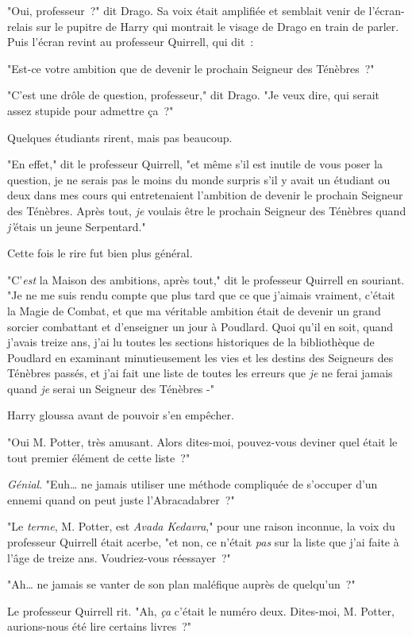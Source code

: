 "Oui, professeur~?" dit Drago. Sa voix était amplifiée et semblait venir de l'écran-relais sur le pupitre de Harry qui montrait le visage de Drago en train de parler. Puis l'écran revint au professeur Quirrell, qui dit~:

"Est-ce votre ambition que de devenir le prochain Seigneur des Ténèbres~?"

"C'est une drôle de question, professeur," dit Drago. "Je veux dire, qui serait assez stupide pour admettre ça~?"

Quelques étudiants rirent, mais pas beaucoup.

"En effet," dit le professeur Quirrell, "et même s'il est inutile de vous poser la question, je ne serais pas le moins du monde surpris s'il y avait un étudiant ou deux dans mes cours qui entretenaient l'ambition de devenir le prochain Seigneur des Ténèbres. Après tout, \emph{je} voulais être le prochain Seigneur des Ténèbres quand \emph{j'}étais un jeune Serpentard."

Cette fois le rire fut bien plus général.

"C'\emph{est} la Maison des ambitions, après tout," dit le professeur Quirrell en souriant. "Je ne me suis rendu compte que plus tard que ce que j'aimais vraiment, c'était la Magie de Combat, et que ma véritable ambition était de devenir un grand sorcier combattant et d'enseigner un jour à Poudlard. Quoi qu'il en soit, quand j'avais treize ans, j'ai lu toutes les sections historiques de la bibliothèque de Poudlard en examinant minutieusement les vies et les destins des Seigneurs des Ténèbres passés, et j'ai fait une liste de toutes les erreurs que \emph{je} ne ferai jamais quand \emph{je} serai un Seigneur des Ténèbres -"

Harry gloussa avant de pouvoir s'en empêcher.

"Oui M. Potter, très amusant. Alors dites-moi, pouvez-vous deviner quel était le tout premier élément de cette liste~?"

\emph{Génial}. "Euh… ne jamais utiliser une méthode compliquée de s'occuper d'un ennemi quand on peut juste l'Abracadabrer~?"

"Le \emph{terme}, M. Potter, est \emph{Avada Kedavra}," pour une raison inconnue, la voix du professeur Quirrell était acerbe, "et non, ce n'était \emph{pas} sur la liste que j'ai faite à l'âge de treize ans. Voudriez-vous réessayer~?"

"Ah… ne jamais se vanter de son plan maléfique auprès de quelqu'un~?"

Le professeur Quirrell rit. "Ah, \emph{ça} c'était le numéro deux. Dites-moi, M. Potter, aurions-nous été lire certains livres~?"

